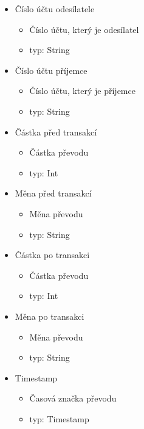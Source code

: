 \documentclass[FM,SP]{tulthesis}
\begin{document}
\begin{itemize}
    \item Číslo účtu odesílatele
          \begin{itemize}
              \item Číslo účtu, který je odesílatel
              \item typ: String
          \end{itemize}
    \item Číslo účtu příjemce
          \begin{itemize}
              \item Číslo účtu, který je příjemce
              \item typ: String
          \end{itemize}
    \item Částka před transakcí
          \begin{itemize}
              \item Částka převodu
              \item typ: Int
          \end{itemize}
    \item Měna před transakcí
          \begin{itemize}
              \item Měna převodu
              \item typ: String
          \end{itemize}
    \item Částka po transakci
          \begin{itemize}
              \item Částka převodu
              \item typ: Int
          \end{itemize}
    \item Měna po transakci
          \begin{itemize}
              \item Měna převodu
              \item typ: String
          \end{itemize}
    \item Timestamp
          \begin{itemize}
              \item Časová značka převodu
              \item typ: Timestamp
          \end{itemize}

\end{itemize}
\end{document}
